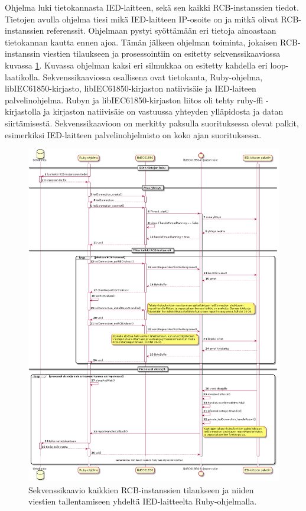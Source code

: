 Ohjelma luki tietokannasta IED-laitteen, sekä sen kaikki RCB-instanssien tiedot. Tietojen avulla ohjelma tiesi mikä IED-laitteen IP-osoite on ja mitkä olivat RCB-instanssien referenssit. Ohjelmaan pystyi syöttämään eri tietoja ainoastaan tietokannan kautta ennen ajoa. Tämän jälkeen ohjelman toiminta, jokaisen RCB-instanssin viestien tilaukseen ja prosessointiin on esitetty sekvenssikaaviossa kuvassa \ref{fig:sequence-diagram-report-subscription}. Kuvassa ohjelman kaksi eri silmukkaa on esitetty kahdella eri loop-laatikolla. Sekvenssikaaviossa osallisena ovat tietokanta, Ruby-ohjelma, libIEC61850-kirjasto, libIEC61850-kirjaston natiivisäie ja IED-laiteen palvelinohjelma. Rubyn ja libIEC61850-kirjaston liitos oli tehty ruby-ffi -kirjastolla ja kirjaston natiivisäie on vastuussa yhteyden ylläpidosta ja datan siirtämisestä. Sekvenssikaavioon on merkitty paksulla suorituksessa olevat palkit, esimerkiksi IED-laitteen palvelinohjelmisto on koko ajan suorituksessa.

\begin{figure}[ht!]
	\includegraphics[width=1\textwidth]{pictures/sequence-diagram-report-subscription.png}
	\caption{Sekvenssikaavio kaikkien RCB-instanssien tilaukseen ja niiden viestien tallentamiseen yhdeltä IED-laitteelta Ruby-ohjelmalla.}
	\label{fig:sequence-diagram-report-subscription}
\end{figure}

